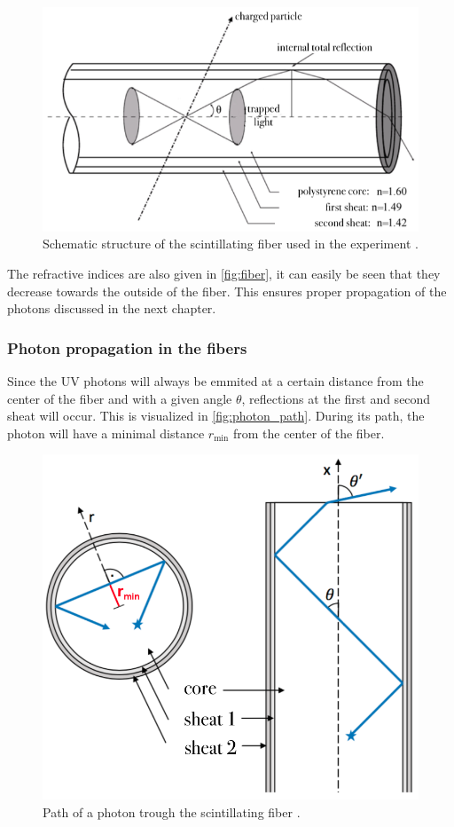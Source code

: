 \begin{figure}[H]
	\centering
	\includegraphics[width=0.7\linewidth]{pics/fiber.png}
	\caption{Schematic structure of the scintillating fiber used in the experiment \cite{SciFi}.}
	\label{fig:fiber}
\end{figure}

The refractive indices are also given in \autoref{fig:fiber}, it can easily be seen that they decrease towards the outside
of the fiber. This ensures proper propagation of the photons discussed in the next chapter.

\subsubsection{Photon propagation in the fibers}
\label{sec:prop}

Since the UV photons will always be emmited at a certain distance from the center of the fiber and with a given angle $\theta$,
reflections at the first and second sheat will occur. This is visualized in \autoref{fig:photon_path}.
During its path, the photon will have a minimal distance $r_\mathrm{min}$ from the center of the fiber.

\begin{figure}[H]
	\centering
	\includegraphics[width=0.5\linewidth]{pics/photon_path.png}
	\caption{Path of a photon trough the scintillating fiber \cite{SciFi}.}
	\label{fig:photon_path}
\end{figure}

